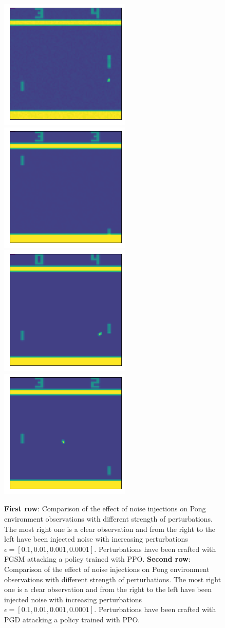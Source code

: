 \begin{figure}
    \subcaptionbox{\label{fig:subfig-g}}
    {\includegraphics[width=0.19\linewidth]{images/noise/PongNoFrameskip-v4_pgda_ppo_eps_0.01.png}}
    \subcaptionbox{\label{fig:subfig-h}}
    {\includegraphics[width=0.19\linewidth]{images/noise/PongNoFrameskip-v4_pgda_ppo_eps_0.001.png}}
    \subcaptionbox{\label{fig:subfig-i}}
    {\includegraphics[width=0.19\linewidth]{images/noise/PongNoFrameskip-v4_pgda_ppo_eps_0.0001.png}}
    \subcaptionbox{\label{fig:subfig-j}}
    {\includegraphics[width=0.19\linewidth]{images/noise/PongNoFrameskip-v4_pgda_ppo_eps_0.1_ori.png}}
  \caption{{\bf First row}: Comparison of the effect of noise injections on Pong environment observations with different strength of perturbations. The most right one is a clear observation and from the right to the left have been injected noise with increasing perturbations \(\epsilon=[0.1, 0.01, 0.001, 0.0001]\). Perturbations have been crafted with FGSM attacking a policy trained with PPO. {\bf Second row}: Comparison of the effect of noise injections on Pong environment observations with different strength of perturbations. The most right one is a clear observation and from the right to the left have been injected noise with increasing perturbations \(\epsilon=[0.1, 0.01, 0.001, 0.0001]\). Perturbations have been crafted with PGD attacking a policy trained with PPO.}
  \label{figure:pong-noise}
\end{figure}


